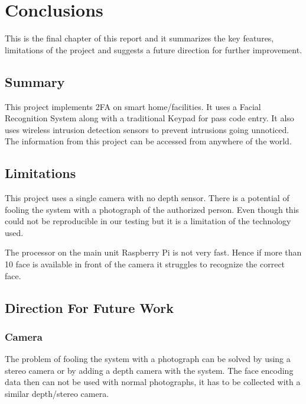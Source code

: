 \chapter{Conclusions}
\label{chap:Conclusions}
\begin{flushleft}
    This is the final chapter of this report and it summarizes the key features, limitations of the project and suggests
    a future direction for further improvement.
\end{flushleft}

\section{Summary}
    \begin{flushleft}
        This project implements 2FA on smart home/facilities. It uses a Facial Recognition System along with a 
        traditional Keypad for pass code entry. It also uses wireless intrusion detection sensors to prevent intrusions
        going unnoticed. The information from this project can be accessed from anywhere of the world.
    \end{flushleft}

\section{Limitations}
    \begin{flushleft}
        This project uses a single camera with no depth sensor. There is a potential of fooling the system with a 
        photograph of the authorized person. Even though this could not be reproducible in our testing but it is a 
        limitation of the technology used. 
        
        The processor on the main unit Raspberry Pi is not very fast. Hence if more than 10 face is available in front 
        of the camera it struggles to recognize the correct face.
    \end{flushleft}

\section{Direction For Future Work}
    \subsection{Camera}
        \begin{flushleft}
            The problem of fooling the system with a photograph can be solved by using a stereo camera or by adding a 
            depth camera with the system. The face encoding data then can not be used with normal photographs, it has 
            to be collected with a similar depth/stereo camera. 
        \end{flushleft}

